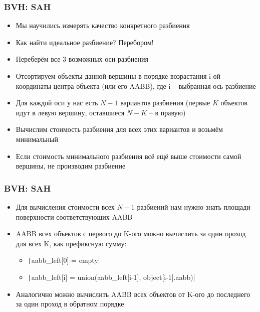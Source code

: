 \documentclass[handout,10pt]{beamer}
\begin{document}
\begin{frame}[fragile]
\frametitle{BVH: SAH}
\begin{itemize}
\item Мы научились измерять качество конкретного разбиения
\pause
\item Как найти идеальное разбиение? \pause Перебором!
\pause
\item Переберём все 3 возможных оси разбиения
\pause
\item Отсортируем объекты данной вершины в порядке возрастания i-ой координаты центра объекта (или его AABB), где i -- выбранная ось разбиение
\pause
\item Для каждой оси у нас есть \begin{math}N-1\end{math} вариантов разбиения (первые \begin{math}K\end{math} объектов идут в левую вершину, оставшиеся \begin{math}N-K\end{math} -- в правую)
\pause
\item Вычислим стоимость разбиения для всех этих вариантов и возьмём минимальный
\pause
\item Если стоимость минимального разбиения всё ещё выше стоимости самой вершины, не производим разбиение
\end{itemize}
\end{frame}

\begin{frame}[fragile]
\frametitle{BVH: SAH}
\begin{itemize}
\item Для вычисления стоимости всех \begin{math}N-1\end{math} разбиений нам нужно знать площади поверхности соответствующих AABB
\pause
\item AABB всех объектов с первого до K-ого можно вычислить за один проход для всех K, как префиксную сумму:
\pause
\begin{itemize}
\item \texttt|aabb_left[0] = empty|
\pause
\item \texttt|aabb_left[i] = union(aabb_left[i-1], object[i-1].aabb)|
\end{itemize}
\pause
\item Аналогично можно вычислить AABB всех объектов от K-ого до последнего за один проход в обратном порядке
\end{itemize}
\end{frame}
\end{document}

